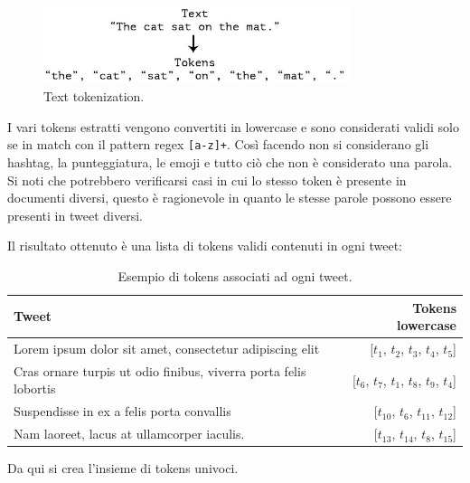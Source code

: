 \documentclass[oneside]{book}
\begin{document}
\begin{figure}[!h]
	\centering
	\includegraphics[width=9cm]{assets/text-to-tokens.jpg}
	\caption{Text tokenization.}
	\label{fig:tokenization}
\end{figure}


\pagebreak

I vari tokens estratti vengono convertiti in lowercase e sono considerati validi solo se in match con il pattern regex \texttt{[a-z]+}. Così facendo non si considerano gli hashtag, la punteggiatura, le emoji e tutto ciò che non è considerato una parola. Si noti che potrebbero verificarsi casi in cui lo stesso token è presente in documenti diversi, questo è ragionevole in quanto le stesse parole possono essere presenti in tweet diversi.


Il risultato ottenuto è una lista di tokens validi contenuti in ogni tweet:

\begin{table}[h!]
	\centering
	\begin{tabular}[t]{lr}
		\hline
		\textbf{Tweet} & \textbf{Tokens lowercase}\\
		\hline
		Lorem ipsum dolor sit amet, consectetur adipiscing elit				& [$t_1$, $t_2$, $t_3$, $t_4$, $t_5$] \\
		Cras ornare turpis ut odio finibus, viverra porta felis lobortis 	& [$t_6$, $t_7$, $t_1$, $t_8$, $t_9$, $t_4$] \\
		Suspendisse in ex a felis porta convallis							& [$t_{10}$, $t_6$, $t_{11}$, $t_{12}$] \\
		Nam laoreet, lacus at ullamcorper iaculis.							& [$t_{13}$, $t_{14}$, $t_8$, $t_{15}$]\\
		
		\hline
	\end{tabular}
	\caption{Esempio di tokens associati ad ogni tweet.}
\end{table}

Da qui si crea l'insieme di tokens univoci.
\end{document}
